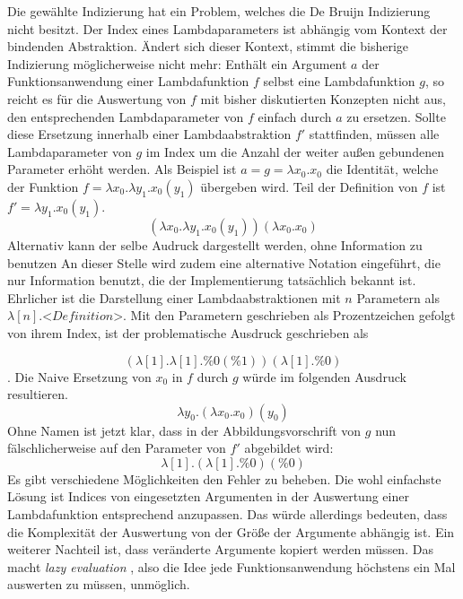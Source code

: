  Die gewählte Indizierung hat ein Problem, welches die De Bruijn Indizierung nicht besitzt. Der Index eines Lambdaparameters ist abhängig vom Kontext der bindenden Abstraktion. Ändert sich dieser Kontext, stimmt die bisherige Indizierung möglicherweise nicht mehr:
 Enthält ein Argument $a$ der Funktionsanwendung einer Lambdafunktion $f$ selbst eine Lambdafunktion $g$, so reicht es für die Auswertung von $f$ mit bisher diskutierten Konzepten nicht aus, den entsprechenden Lambdaparameter von $f$ einfach durch $a$ zu ersetzen. Sollte diese Ersetzung innerhalb einer Lambdaabstraktion $f'$ stattfinden, müssen alle Lambdaparameter von $g$ im Index um die Anzahl der weiter außen gebundenen Parameter erhöht werden. Als Beispiel ist $a = g = \lambda x_0 .x_0$ die Identität, welche der Funktion $f = \lambda x_0 .\lambda y_1 .x_0(y_1)$ übergeben wird. Teil der Definition von $f$ ist $f' = \lambda y_1 .x_0(y_1)$.
 $$(\lambda x_0 .\lambda y_1 .x_0(y_1))(\lambda x_0 .x_0)$$
 Alternativ kann der selbe Audruck dargestellt werden, ohne Information zu benutzen
 An dieser Stelle wird zudem eine alternative Notation eingeführt, die nur Information benutzt, die der Implementierung tatsächlich bekannt ist. Ehrlicher ist die Darstellung einer Lambdaabstraktionen mit $n$ Parametern als $\lambda [n] .\textit{<Definition>}$. Mit den Parametern geschrieben als Prozentzeichen gefolgt von ihrem Index, ist der problematische Ausdruck geschrieben als
 
 $$(\lambda [1] .\lambda [1] .\%0(\%1))(\lambda [1] .\%0)$$.
 Die Naive Ersetzung von $x_0$ in $f$ durch $g$ würde im folgenden Ausdruck resultieren.
 $$\lambda y_0 .(\lambda x_0 .x_0)(y_0)$$
 Ohne Namen ist jetzt klar, dass in der Abbildungsvorschrift von $g$ nun fälschlicherweise auf den Parameter von $f'$ abgebildet wird:
 $$\lambda [1] .(\lambda [1] .\%0)(\%0)$$
 Es gibt verschiedene Möglichkeiten den Fehler zu beheben. Die wohl einfachste Lösung ist Indices von eingesetzten Argumenten in der Auswertung einer Lambdafunktion entsprechend anzupassen. Das würde allerdings bedeuten, dass die Komplexität der Auswertung von der Größe der Argumente abhängig ist. Ein weiterer Nachteil ist, dass veränderte Argumente kopiert werden müssen. Das macht \emph{lazy evaluation} \cite{EvalStrategien}, also die Idee jede Funktionsanwendung höchstens ein Mal auswerten zu müssen, unmöglich.
 
